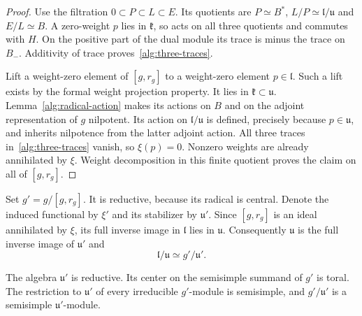 \begin{proof}
Use the filtration $0\subset P\subset L\subset E$. Its quotients
are $P\simeq B^*$, $L/P\simeq\mathfrak l/\mathfrak u$ and
$E/L\simeq B$. A zero-weight $p$ lies in $\mathfrak k$, so acts
on all three quotients and commutes with $H$. On the positive part
of the dual module its trace is minus the trace on $B_-$.
Additivity of trace proves~\eqref{alg:three-traces}.

Lift a weight-zero element of $[g,r_g]$ to a weight-zero element
$p\in\mathfrak l$. Such a lift exists by the formal weight
projection property. It lies in $\mathfrak k\subset\mathfrak u$.
Lemma~\ref{alg:radical-action} makes its actions on $B$ and on the
adjoint representation of $g$ nilpotent. Its action on
$\mathfrak l/\mathfrak u$ is defined, precisely because
$p\in\mathfrak u$, and inherits nilpotence from the latter
adjoint action. All three traces in~\eqref{alg:three-traces}
vanish, so $\xi(p)=0$. Nonzero weights are already annihilated by
$\xi$. Weight decomposition in this finite quotient proves the
claim on all of $[g,r_g]$.
\end{proof}

Set $g'=g/[g,r_g]$. It is reductive, because its radical is central.
Denote the induced functional by $\xi'$ and its stabilizer by
$\mathfrak u'$. Since $[g,r_g]$ is an ideal annihilated by $\xi$,
its full inverse image in $\mathfrak l$ lies in $\mathfrak u$.
Consequently $\mathfrak u$ is the full inverse image of
$\mathfrak u'$ and
\begin{equation}
 \mathfrak l/\mathfrak u\simeq g'/\mathfrak u'.
 \label{alg:reductive-tangent}
\end{equation}

\begin{lemma}
\label{alg:reductive-stabilizer}
The algebra $\mathfrak u'$ is reductive. Its center on the
semisimple summand of $g'$ is toral. The restriction to
$\mathfrak u'$ of every irreducible $g'$-module is semisimple,
and $g'/\mathfrak u'$ is a semisimple $\mathfrak u'$-module.
\end{lemma}

